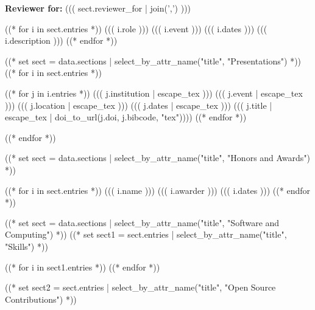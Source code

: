 \documentclass[10pt, letterpaper]{awesome-cv}
\begin{document}
\textbf{Reviewer for:} ((( sect.reviewer_for | join(',') )))

\begin{cventries}
((* for i in sect.entries *))
\cventry
  {((( i.role )))}
  {((( i.event )))}
  {}
  {((( i.dates )))}
  {((( i.description )))}
((* endfor *))
\end{cventries}

((* set sect = data.sections | select_by_attr_name("title", "Presentations") *))
((* for i in sect.entries *))
\begin{cventries}
((* for j in i.entries *))
\cventry
  {((( j.institution | escape_tex )))}
  {((( j.event | escape_tex )))}
  {((( j.location | escape_tex )))}
  {((( j.dates | escape_tex )))}
  {((( j.title | escape_tex | doi_to_url(j.doi, j.bibcode, "tex"))))}
((* endfor *))
\end{cventries}
((* endfor *))

((* set sect = data.sections | select_by_attr_name("title", "Honors and Awards") *))
\begin{cvhonors}
((* for i in sect.entries *))
\cvhonor
  {((( i.name )))}
  {((( i.awarder )))}
  {}
  {((( i.dates )))}
((* endfor *))
\end{cvhonors}

((* set sect = data.sections | select_by_attr_name("title", "Software and Computing") *))
((* set sect1 = sect.entries | select_by_attr_name("title", "Skills") *))
\begin{cvskills}
((* for i in sect1.entries *))
((* endfor *))
\end{cvskills}
((* set sect2 = sect.entries | select_by_attr_name("title", "Open Source Contributions") *))
\end{document}
